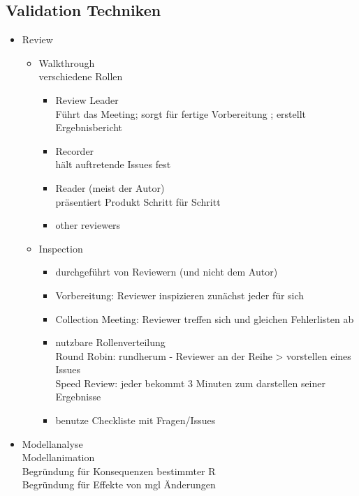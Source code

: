 \subsection{Validation Techniken}
\begin{itemize}
	\item Review
	\begin{itemize}
		\item Walkthrough\\
		verschiedene Rollen
		\begin{itemize}
			\item Review Leader\\
			Führt das Meeting; sorgt für fertige Vorbereitung ; erstellt Ergebnisbericht
			
			\item Recorder\\
			hält auftretende Issues fest
			
			\item Reader (meist der Autor)\\
			präsentiert Produkt Schritt für Schritt
			
			\item other reviewers
		\end{itemize}
		
		\item Inspection
		\begin{itemize}
			\item durchgeführt von Reviewern (und nicht dem Autor) 
			
			\item Vorbereitung: Reviewer inspizieren zunächst jeder für sich
			
			\item Collection Meeting: Reviewer treffen sich und gleichen Fehlerlisten ab
			
			\item nutzbare Rollenverteilung\\
			Round Robin: rundherum - Reviewer an der Reihe > vorstellen eines Issues\\
			Speed Review: jeder bekommt 3 Minuten zum darstellen seiner Ergebnisse
			
			\item benutze Checkliste mit Fragen/Issues
		\end{itemize}
	\end{itemize}
	
	\item Modellanalyse\\
	Modellanimation\\
	Begründung für Konsequenzen bestimmter R\\
	Begründung für Effekte von mgl Änderungen
	

\end{itemize}
